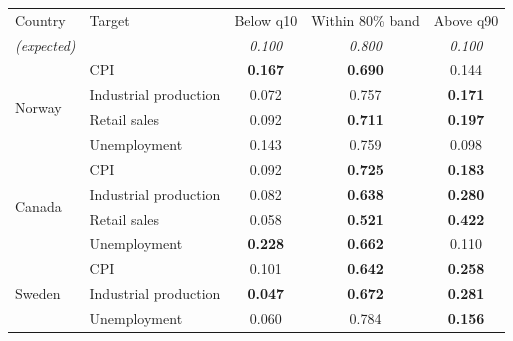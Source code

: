 \begin{tabular}{llccc}
\toprule
Country & Target & Below q10 & Within 80\% band & Above q90 \\
\textit{(expected)} &  & \textit{0.100} & \textit{0.800} & \textit{0.100} \\
\midrule
\multirow{4}{*}{Norway} & CPI & \textbf{0.167} & \textbf{0.690} & 0.144 \\
 & Industrial production & 0.072 & 0.757 & \textbf{0.171} \\
 & Retail sales & 0.092 & \textbf{0.711} & \textbf{0.197} \\
 & Unemployment & 0.143 & 0.759 & 0.098 \\
\midrule
\multirow{4}{*}{Canada} & CPI & 0.092 & \textbf{0.725} & \textbf{0.183} \\
 & Industrial production & 0.082 & \textbf{0.638} & \textbf{0.280} \\
 & Retail sales & 0.058 & \textbf{0.521} & \textbf{0.422} \\
 & Unemployment & \textbf{0.228} & \textbf{0.662} & 0.110 \\
\midrule
\multirow{3}{*}{Sweden} & CPI & 0.101 & \textbf{0.642} & \textbf{0.258} \\
 & Industrial production & \textbf{0.047} & \textbf{0.672} & \textbf{0.281} \\
 & Unemployment & 0.060 & 0.784 & \textbf{0.156} \\
\bottomrule
\end{tabular}
